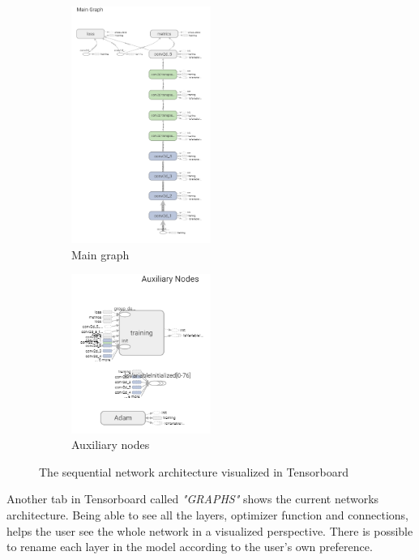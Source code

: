 \documentclass[USenglish]{ifimaster}  %
\begin{document}
\begin{figure}[H]
\centering
\begin{subfigure}[b]{\textwidth}
\centering
\includegraphics[width=0.5\textwidth]{bilder/tensorboard_graph_1.PNG}
\caption{Main graph}
\end{subfigure}
\hfill
\begin{subfigure}[b]{\textwidth}
\centering
\includegraphics[width=0.5\textwidth]{bilder/tensorboard_graph_2.PNG}
\caption{Auxiliary nodes}
\end{subfigure}
\caption{The sequential network architecture visualized in Tensorboard}
\label{fig:graph}
\end{figure}

Another tab in Tensorboard called \textit{"GRAPHS"} shows the current networks architecture. Being able to see all the layers, optimizer function and connections, helps the user see the whole network in a visualized perspective. There is possible to rename each layer in the model according to the user's own preference. 
\end{document}

